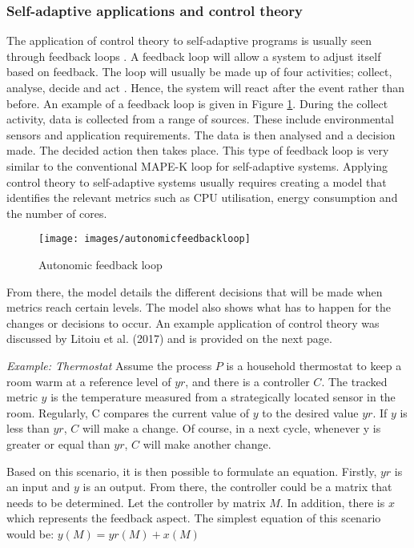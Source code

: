 \subsubsection{Self-adaptive applications and control theory}
The application of control theory to self-adaptive programs is
usually seen through feedback loops \cite{litoiu2017can}. A feedback
loop will allow a system to adjust itself based on feedback. The loop
will usually be made up of four activities; collect, analyse, decide and
act \cite{Brun2009}. Hence, the system will react after the event rather than before. An
example of a feedback loop is given in Figure \ref{fig:feedback loop}. During the collect
activity, data is collected from a range of sources. These include
environmental sensors and application requirements. The data is then
analysed and a decision made. The decided action then takes place. This
type of feedback loop is very similar to the conventional MAPE-K loop for self-adaptive systems. Applying
control theory to self-adaptive systems usually requires creating a
model that identifies the relevant metrics \cite{litoiu2017can} such as
CPU utilisation, energy consumption and the number of cores. 
\begin{figure} [hbt!]
    \centering
    \texttt{[image: images/autonomicfeedbackloop]}
    \caption{Autonomic feedback loop}
    \label{fig:feedback loop}
\end{figure}
\newline\newline
From there,
the model details the different decisions that will be made when metrics
reach certain levels. The model also shows what has to happen for the
changes or decisions to occur. An example application of control theory was discussed by Litoiu et
al. (2017) and is provided on the next page.
\begin{displayquote}
\emph{Example: Thermostat}
\newline\newline
Assume the process $P$ is a household thermostat to keep a room warm at a reference level of $yr$, and there is a  controller $C$. The tracked metric $y$ is the temperature measured from a strategically located sensor in the room. Regularly, C compares the current value of $y$ to the desired value $yr$. If $y$ is less than $yr$, $C$ will make a change. Of course, in a next cycle, whenever y is greater or equal than $yr$, $C$ will make another change. 
\end{displayquote}
Based on this scenario, it is then possible to formulate an equation. Firstly, $yr$ is an input and $y$ is an output. From there, the controller could be a matrix that needs to be determined. Let the controller by matrix $M$. In addition, there is $x$ which represents the feedback aspect. The simplest equation of this scenario would be:
\newline\newline
$y(M) = yr(M) + x(M)$


